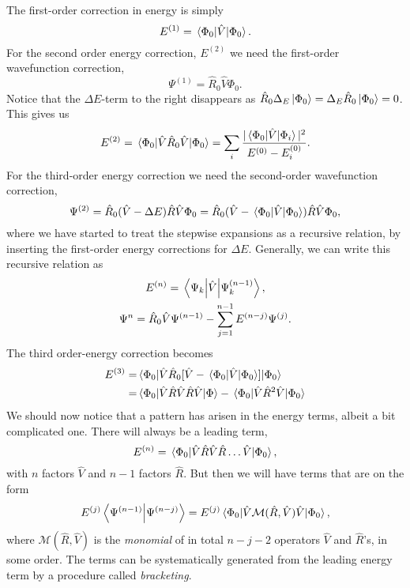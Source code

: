 The first-order correction in energy is simply
\begin{equation}
    E^{(1)} = \mel{\Phi_0}{\hat{V}}{\Phi_0}.
\end{equation}
For the second order energy correction, $E^{(2)}$ we need the first-order 
wavefunction correction,
\begin{equation}
    \Psi^{(1)} = \hat{R}_0\hat{V}\Phi_0.
\end{equation}
Notice that the $\Delta E$-term to the right disappears as 
$\hat{R}_0\Delta_E\ket{\Phi_0} = \Delta_E\hat{R}_0\ket{\Phi_0} = 0$.
This gives us
\begin{equation}
    E^{(2)} = \mel{\Phi_0}{\hat{V}\hat{R}_0\hat{V}}{\Phi_0}
        = \sum_{i} \frac{|\mel{\Phi_0}{\hat{V}}{\Phi_i}|^2}{E^{(0)} - E^{(0)}_i}.
\end{equation}
For the third-order energy correction we need the second-order wavefunction correction,
\begin{equation}
    \Psi^{(2)} = \hat{R}_0(\hat{V} - \Delta E)\hat{R}\hat{V} \Phi_0
        = \hat{R}_0(\hat{V} - \mel{\Phi_0}{\hat{V}}{\Phi_0})\hat{R}\hat{V} \Phi_0,
\end{equation}
where we have started to treat the stepwise expansions as a recursive relation, by 
inserting the first-order energy corrections for $\Delta E$. Generally, we can 
write this recursive relation as
\begin{gather}
    E^{(n)} = \mel{\Psi_k}{\hat{V}}{\Psi^{(n-1)}_k}, \\
    \label{eq:recursive_relation_RSPT_wavefunction}
    \Psi^{n} = \hat{R}_0 \hat{V}\Psi^{(n-1)} - \sum_{j=1}^{n-1}E^{(n-j)} \Psi^{(j)}.
\end{gather}
The third order-energy correction becomes
\begin{equation}
    \begin{aligned}
    \label{eq:third_order_RSPT_energy}
    E^{(3)} =& \mel{\Phi_0}{\hat{V}\hat{R}_0[\hat{V} - \mel{\Phi_0}{\hat{V}}{\Phi_0}]}{\Phi_0} \\
        =& \mel{\Phi_0}{\hat{V}\hat{R}\hat{V}\hat{R}\hat{V}}{\Phi}
            - \mel{\Phi_0}{\hat{V} \hat{R}^2\hat{V}}{\Phi_0}
    \end{aligned}
\end{equation}
We should now notice that a pattern has arisen in the energy terms, albeit a bit complicated one. 
There will always be a leading term,
\begin{equation}
    E^{(n)} = \mel{\Phi_0}{\hat{V}\hat{R}\hat{V}\hat{R}\dots\hat{V}}{\Phi_0},
\end{equation}
with $n$ factors $\hat{V}$ and $n-1$ factors $\hat{R}$. But then we will have 
terms that are on the form 
\begin{equation}
    E^{(j)}\braket{\Psi^{(n-1)}}{\Psi^{(n-j)}} 
    = E^{(j)}\mel{\Phi_0}{\hat{V}\mathcal{M}(\hat{R}, \hat{V})\hat{V}}{\Phi_0},
\end{equation}
where $\mathcal{M}(\hat{R}, \hat{V})$ is the \emph{monomial} of in total 
$n - j - 2$ operators $\hat{V}$ and $\hat{R}$'s, in some order. The terms 
can be systematically generated from the leading energy term by a procedure called 
\emph{bracketing}.

